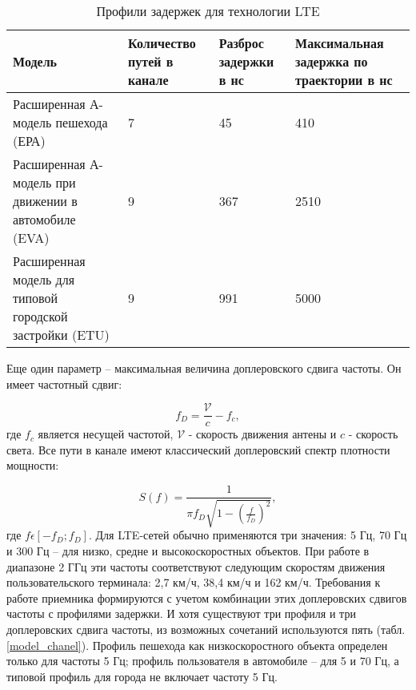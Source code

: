 \begin{table} [htb]
  \centering
\parbox{15cm}{\caption{Профили задержек для технологии LTE \cite{iks}}\label{ProfileDelay}}
    \begin{tabular}{|p{4cm}|p{3cm}|p{3cm}|p{4cm}|}
    \hline \hline
    Модель                                                            &  Количество путей в канале &  Разброс задержки в нс &  Максимальная задержка по траектории в нс \\ \hline \hline
    Расширенная А-модель пешехода (ЕРА)                               & 7                          & 45                     & 410                                       \\ \hline
    Расширенная А-модель при движении в автомобиле (EVA) & 9                          & 367                    & 2510                                      \\ \hline
    Расширенная модель для типовой городской застройки (ETU)          & 9                          & 991                    & 5000                                      \\ \hline
    \end{tabular}
\end{table}



Еще один параметр – максимальная величина доплеровского сдвига частоты. Он имеет частотный сдвиг:

\begin{equation}\label{eq:maxDeltaF}
f_{D}=\frac{\mathcal{V}}{c}-f_{c},
\end{equation}
\noindent где $f_{c}$ является несущей частотой, $\mathcal{V}$ - скорость движения антены и $c$ - скорость света. Все пути в канале имеют классический доплеровский спектр плотности мощности:

\begin{equation}\label{eq:maxDeltaF1}
S(f)=\frac{1}{\pi f_D \sqrt{1-(\frac{f}{f_D})^2}},
\end{equation}
\noindent где $f\epsilon [-f_D;f_D]$. Для LTE-сетей обычно применяются три значения: 5 Гц, 70 Гц и 300 Гц – для низко, средне и высокоскоростных объектов. При работе в диапазоне 2 ГГц эти частоты соответствуют следующим скоростям движения пользовательского терминала: 2,7 км/ч, 38,4 км/ч и 162 км/ч. Требования к работе приемника формируются с учетом комбинации этих доплеровских сдвигов частоты с профилями задержки. И хотя существуют три профиля и три доплеровских сдвига частоты, из возможных сочетаний используются пять (табл. \ref{model_chanel}). Профиль пешехода как низкоскоростного объекта определен только для частоты 5 Гц; профиль пользователя в автомобиле – для 5 и 70 Гц, а типовой профиль для города не включает частоту 5 Гц.






